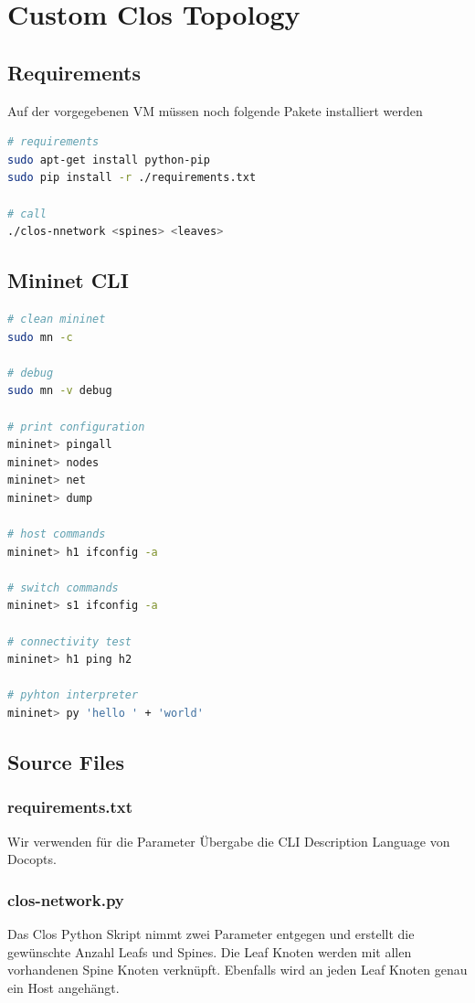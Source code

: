 

\newcommand{\SUBJECT}{Report}
\newcommand{\TITLE}{Cloud Infrastructre Lab 7}



\section{Custom Clos Topology}
\subsection{Requirements}
Auf der vorgegebenen VM müssen noch folgende Pakete installiert werden
\begin{lstlisting}[language=bash]
# requirements
sudo apt-get install python-pip
sudo pip install -r ./requirements.txt

# call
./clos-nnetwork <spines> <leaves>
\end{lstlisting}

\subsection{Mininet CLI}
\begin{lstlisting}[language=bash]
# clean mininet
sudo mn -c

# debug
sudo mn -v debug

# print configuration
mininet> pingall
mininet> nodes
mininet> net
mininet> dump

# host commands
mininet> h1 ifconfig -a

# switch commands
mininet> s1 ifconfig -a

# connectivity test
mininet> h1 ping h2

# pyhton interpreter
mininet> py 'hello ' + 'world'
\end{lstlisting}

\subsection{Source Files}
\subsubsection{requirements.txt}
Wir verwenden für die Parameter Übergabe die CLI Description Language von Docopts. 


\subsubsection{clos-network.py}
Das Clos Python Skript nimmt zwei Parameter entgegen und erstellt die gewünschte Anzahl Leafs und Spines. Die Leaf Knoten werden mit allen vorhandenen Spine Knoten verknüpft. Ebenfalls wird an jeden Leaf Knoten genau ein Host angehängt.


